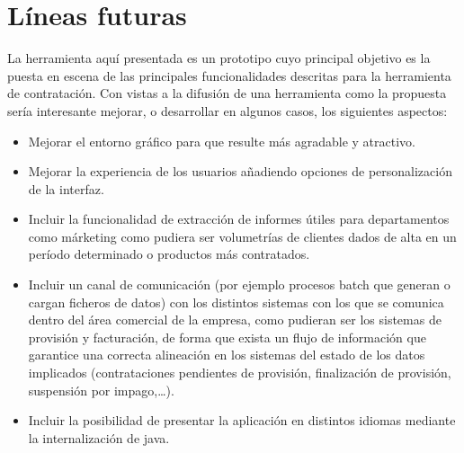 \section{Líneas futuras}
\label{sec:futuro}

La herramienta aquí presentada es un prototipo cuyo principal objetivo es la puesta en escena de las principales funcionalidades descritas para la herramienta de contratación. Con vistas a la difusión de una herramienta como la propuesta sería interesante mejorar, o desarrollar en algunos casos, los siguientes aspectos:

\begin{itemize}
\item Mejorar el entorno gráfico para que resulte más agradable y atractivo.
\item Mejorar la experiencia de los usuarios añadiendo opciones de personalización de la interfaz.
\item Incluir la funcionalidad de extracción de informes útiles para departamentos como márketing como pudiera ser volumetrías de clientes dados de alta en un período determinado o productos más contratados.
\item Incluir un canal de comunicación (por ejemplo procesos batch que generan o cargan ficheros de datos) con los distintos sistemas con los que se comunica dentro del área comercial de la empresa, como pudieran ser los sistemas de provisión y facturación, de forma que exista un flujo de información que garantice una correcta alineación en los sistemas del estado de los datos implicados (contrataciones pendientes de provisión, finalización de provisión, suspensión por impago,\dots).
\item Incluir la posibilidad de presentar la aplicación en distintos idiomas mediante la internalización de java.
\end{itemize}
